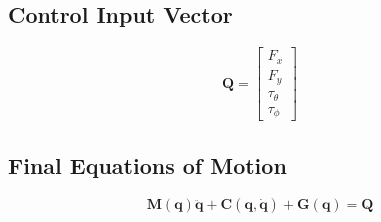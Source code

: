 \documentclass[12pt]{article}
\begin{document}
\subsection{Control Input Vector}

\begin{equation}
    \mathbf{Q} = \begin{bmatrix} F_x \\ F_y \\ \tau_\theta \\ \tau_\phi \end{bmatrix}
\end{equation}

\subsection{Final Equations of Motion}

\begin{equation}
    \mathbf{M}(\mathbf{q})\ddot{\mathbf{q}} + \mathbf{C}(\mathbf{q},\dot{\mathbf{q}}) + \mathbf{G}(\mathbf{q}) = \mathbf{Q}
\end{equation}
\end{document}
